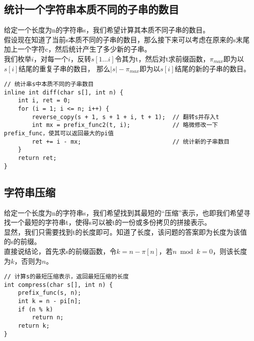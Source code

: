     \subsection{统计一个字符串本质不同的子串的数目}
        给定一个长度为n的字符串s，我们希望计算其本质不同子串的数目。\\
        假设现在知道了当前s本质不同的子串的数目，那么接下来可以考虑在原来的s末尾加上一个字符c，然后统计产生了多少新的子串。\\
        我们枚举$i$，对每一个$i$，反转$s[1 \dots i]$令其为t，然后对t求前缀函数，$\pi_{max}$即为以$s[i]$结尾的重复子串的数目，
        那么$|s|-\pi_{max}$即为以$s[i]$结尾的新的子串的数目。
        \begin{lstlisting}
// 统计串s中本质不同的子串数目
inline int diff(char s[], int n) {
    int i, ret = 0;
    for (i = 1; i <= n; i++) {
        reverse_copy(s + 1, s + 1 + i, t + 1);  // 翻转s并存入t
        int mx = prefix_func2(t, i);            // 略微修改一下prefix_func，使其可以返回最大的pi值
        ret += i - mx;                          // 统计新的子串数目
    }
    return ret;
}
        \end{lstlisting}
    \subsection{字符串压缩}
        给定一个长度为n的字符串s，我们希望找到其最短的“压缩”表示，也即我们希望寻找一个最短的字符串t，使得s可以被t的一份或多份拷贝的拼接表示。\\
        显然，我们只需要找到t的长度即可。知道了长度，该问题的答案即为长度为该值的s的前缀。\\
        直接说结论，首先求s的前缀函数，令$k=n-\pi[n]$，若$n \bmod k = 0$，则该长度为$k$，否则为$n$。
        \begin{lstlisting}
// 计算s的最短压缩表示，返回最短压缩的长度
int compress(char s[], int n) {
    prefix_func(s, n);
    int k = n - pi[n];
    if (n % k)
        return n;
    return k;
}
        \end{lstlisting}
